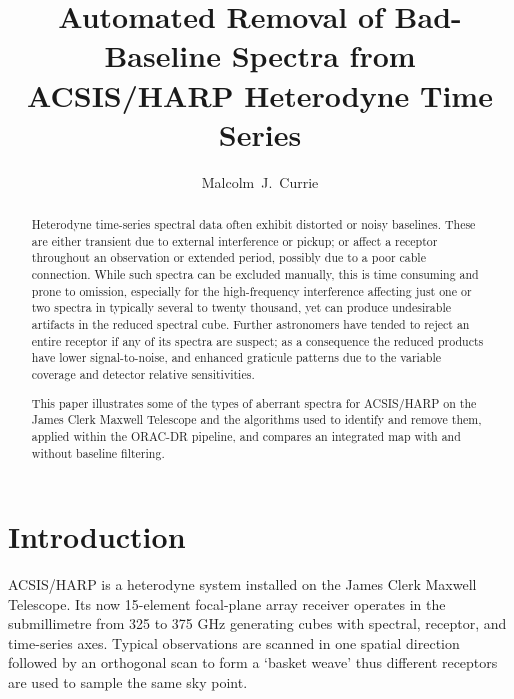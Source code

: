 
\resetcounters



\title{Automated Removal of Bad-Baseline Spectra from ACSIS/HARP
Heterodyne Time Series}
\author{Malcolm~J.~Currie
}


\begin{abstract}
Heterodyne time-series spectral data often exhibit distorted or noisy baselines. These are either transient due to external interference or pickup; or affect a receptor throughout an observation or extended period, possibly due to a poor cable connection. While such spectra can be excluded manually, this is time consuming and prone to omission, especially for the high-frequency interference affecting just one or two spectra in typically several to twenty thousand, yet can produce undesirable artifacts in the reduced spectral cube. Further astronomers have tended to reject an entire receptor if any of its spectra are suspect; as a consequence the reduced products have lower signal-to-noise, and enhanced graticule patterns due to the variable coverage and detector relative sensitivities.

This paper illustrates some of the types of aberrant spectra for ACSIS/HARP on the James Clerk Maxwell Telescope and the algorithms used to identify and remove them, applied within the ORAC-DR pipeline, and compares an integrated map with and without baseline filtering. 
\end{abstract}

\section{Introduction}

ACSIS/HARP \citep{buckle_2009} is a heterodyne system installed on the James Clerk Maxwell Telescope. Its now 15-element focal-plane array receiver operates in the submillimetre from 325 to 375 GHz generating cubes with spectral, receptor, and time-series axes. Typical observations are scanned in one spatial direction followed by an orthogonal scan to form a `basket weave' thus different receptors are used to sample the same sky point.

